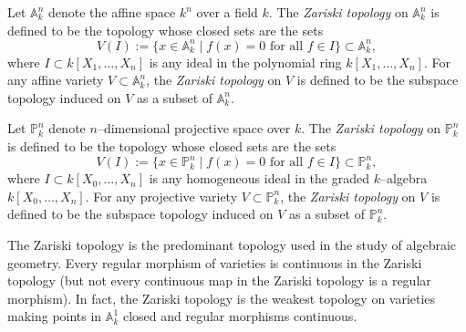\documentclass[12pt]{article}
\newcommand{\A}{\mathbb{A}}
\renewcommand{\P}{\mathbb{P}}
\begin{document}
Let $\A_k^n$ denote the affine space $k^n$ over a field $k$. The {\em Zariski topology} on $\A_k^n$ is defined to be the topology whose closed sets are the sets
$$
V(I) := \{ x \in \A_k^n \mid f(x) = 0 \text{ for all } f \in I\} \subset \A_k^n,
$$
where $I \subset k[X_1, \ldots, X_n]$ is any ideal in the polynomial ring $k[X_1, \ldots, X_n]$. For any affine variety $V \subset \A_k^n$, the {\em Zariski topology} on $V$ is defined to be the subspace topology induced on $V$ as a subset of $\A_k^n$.

Let $\P_k^n$ denote $n$--dimensional projective space over $k$. The {\em Zariski topology} on $\P_k^n$ is defined to be the topology whose closed sets are the sets
$$
V(I) := \{ x \in \P_k^n \mid f(x) = 0 \text{ for all } f \in I\} \subset \P_k^n,
$$
where $I \subset k[X_0, \ldots, X_n]$ is any homogeneous ideal in the graded $k$--algebra $k[X_0, \ldots, X_n]$. For any projective variety $V \subset \P_k^n$, the {\em Zariski topology} on $V$ is defined to be the subspace topology induced on $V$ as a subset of $\P_k^n$.

The Zariski topology is the predominant topology used in the study of algebraic geometry. Every regular morphism of varieties is continuous in the Zariski topology (but not every continuous map in the Zariski topology is a regular morphism). In fact, the Zariski topology is the weakest topology on varieties making points in $\A_k^1$ closed and regular morphisms continuous.
\end{document}
